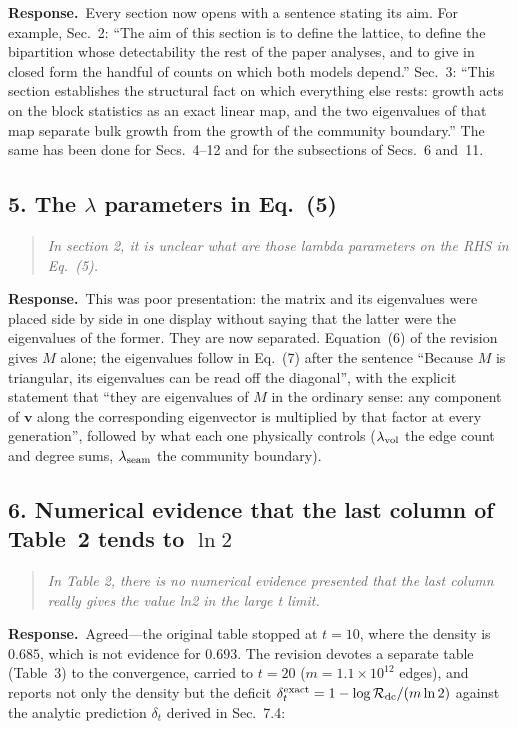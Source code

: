 \documentclass[11pt]{article}
\newcommand{\Rev}{\mathcal{R}}
\newcommand{\logR}{\log \Rev}
\newenvironment{point}{\begin{quote}\itshape}{\end{quote}}
\newcommand{\reply}{\par\noindent\textbf{Response.}\ }
\begin{document}
\reply Every section now opens with a sentence stating its aim. For example,
Sec.~2: ``The aim of this section is to define the lattice, to define the
bipartition whose detectability the rest of the paper analyses, and to give in
closed form the handful of counts on which both models depend.'' Sec.~3: ``This
section establishes the structural fact on which everything else rests: growth
acts on the block statistics as an exact linear map, and the two eigenvalues of
that map separate bulk growth from the growth of the community boundary.'' The
same has been done for Secs.~4--12 and for the subsections of Secs.~6 and~11.

\subsection*{5. The $\lambda$ parameters in Eq.~(5)}

\begin{point}
In section 2, it is unclear what are those lambda parameters on the RHS in
Eq.~(5).
\end{point}

\reply This was poor presentation: the matrix and its eigenvalues were placed
side by side in one display without saying that the latter were the eigenvalues
of the former. They are now separated. Equation~(6) of the revision gives $M$
alone; the eigenvalues follow in Eq.~(7) after the sentence ``Because $M$ is
triangular, its eigenvalues can be read off the diagonal'', with the explicit
statement that ``they are eigenvalues of $M$ in the ordinary sense: any
component of $\bm v$ along the corresponding eigenvector is multiplied by that
factor at every generation'', followed by what each one physically controls
($\lambda_{\rm vol}$ the edge count and degree sums, $\lambda_{\rm seam}$ the
community boundary).

\subsection*{6. Numerical evidence that the last column of Table~2 tends to $\ln 2$}

\begin{point}
In Table 2, there is no numerical evidence presented that the last column
really gives the value ln2 in the large t limit.
\end{point}

\reply Agreed---the original table stopped at $t=10$, where the density is
$0.685$, which is not evidence for $0.693$. The revision devotes a separate
table (Table~3) to the convergence, carried to $t=20$ ($m=1.1\times10^{12}$
edges), and reports not only the density but the deficit
$\delta_t^{\rm exact}=1-\logR_{\rm dc}/(m\ln2)$ against the analytic prediction
$\delta_t$ derived in Sec.~7.4:
\end{document}
